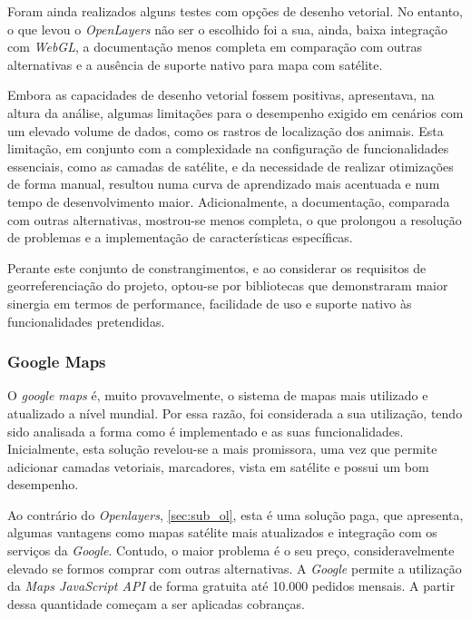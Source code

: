 Foram ainda realizados alguns testes com opções de desenho vetorial. No entanto, o que levou o \textit{OpenLayers} não ser o escolhido foi a sua, ainda, baixa integração com \textit{WebGL}, a documentação menos completa em comparação com outras alternativas e a ausência de suporte nativo para mapa com satélite. 

Embora as capacidades de desenho vetorial fossem positivas, apresentava, na altura da análise, algumas limitações para o desempenho exigido em cenários com um elevado volume de dados, como os rastros de localização dos animais. Esta limitação, em conjunto com a complexidade na configuração de funcionalidades essenciais, como as camadas de satélite, e da necessidade de realizar otimizações de forma manual, resultou numa curva de aprendizado mais acentuada e num tempo de desenvolvimento maior. Adicionalmente, a documentação, comparada com outras alternativas, mostrou-se menos completa, o que prolongou a resolução de problemas e a implementação de características específicas. 

Perante este conjunto de constrangimentos, e ao considerar os requisitos de georreferenciação do projeto, optou-se por bibliotecas que demonstraram maior sinergia em termos de performance, facilidade de uso e suporte nativo às funcionalidades pretendidas.

\subsubsection{\textbf{Google Maps}}\label{sec:sub_gm}
O \textit{google maps} é, muito provavelmente, o sistema de mapas mais utilizado e atualizado a nível mundial. Por essa razão, foi considerada a sua utilização, tendo sido analisada a forma como é implementado e as suas funcionalidades. Inicialmente, esta solução revelou-se a mais promissora, uma vez que permite adicionar camadas vetoriais, marcadores, vista em satélite e possui um bom desempenho. 

Ao contrário do \textit{Openlayers}, \ref{sec:sub_ol}, esta é uma solução paga, que apresenta, algumas vantagens como mapas satélite mais atualizados e integração com os serviços da \textit{Google}. Contudo, o maior problema é o seu preço, consideravelmente elevado se formos comprar com outras alternativas. A \textit{Google} permite a utilização da {\textit{Maps JavaScript API}}\cite{google.maps.url} de forma gratuita até 10.000 pedidos mensais. A partir dessa quantidade começam a ser aplicadas cobranças.


